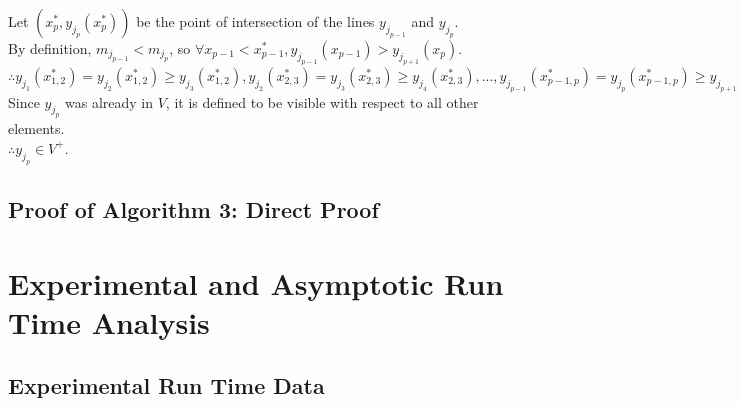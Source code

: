 \documentclass{article}
\begin{document}
Let $(x^*_p, y_{j_p}(x^*_p))$ be the point of intersection of the lines $y_{j_{p-1}}$ and $y_{j_{p}}$.\\
By definition, $m_{j_{p-1}} < m_{j_{p}}$, so $\forall x_{p-1} < x^*_{p-1}, y_{j_{p-1}} (x_{p-1}) > y_{j_{p+1}} (x_p)$.\\
$\therefore y_{j_{1}}(x^*_{1,2}) = y_{j_{2}}(x^*_{1,2}) \geq y_{j_3}(x^*_{1,2}), y_{j_{2}}(x^*_{2,3}) = y_{j_{3}}(x^*_{2,3}) \geq y_{j_4}(x^*_{2,3}), ..., y_{j_{p-1}}(x^*_{p-1,p}) = y_{j_{p}}(x^*_{p-1,p}) \geq y_{j_{p+1}}(x^*_{p-1,p}), ..., y_{j_{k-1}}(x^*_{k-1,k}) = y_{j_{k}}(x^*_{k-1,k}) \geq y_{j_{i}}(x^*_{k-1,k})$\\
Since $y_{j_p}$ was already in $V$, it is defined to be visible with respect to all other elements.\\
$\therefore y_{j_p} \in V^+$.

\subsection*{Proof of Algorithm 3: Direct Proof}

\section*{Experimental and Asymptotic Run Time Analysis}
\subsection*{Experimental Run Time Data}


\pagebreak
\end{document}
